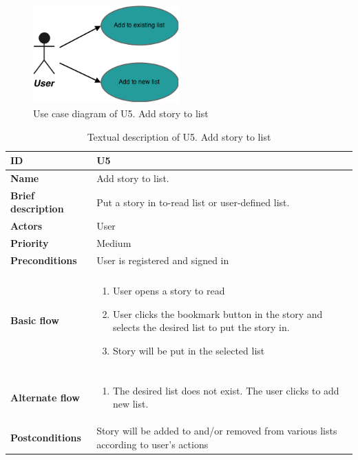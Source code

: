 \begin{figure}[hp]
	\includegraphics[width=0.5\textwidth]{fig/U5}
	\centering
	\caption{Use case diagram of U5. Add story to list}
	\label{Fig:U5}
\end{figure}

\begin{table}[hp]
	\renewcommand{\arraystretch}{1.5}
	\centering
	\caption{Textual description of U5. Add story to list}
	\begin{tabular}[b]{| p{3.5cm} | p{13cm}|}\hline
		\textbf{ID} 				& U5									\\\hline
		\textbf{Name} 				& Add story to list.					\\\hline
		\textbf{Brief description}	& Put a story in to-read list or user-defined  list. 		\\\hline
		\textbf{Actors} 			& User									\\\hline
		\textbf{Priority}			& Medium								\\\hline
		\textbf{Preconditions}		& User is registered and signed in		\\\hline&\\[-2ex]
		\textbf{Basic flow}			& \begin{minipage}{5in}
			\begin{enumerate}[noitemsep]
				\item User opens a story to read
				\item User clicks the bookmark button in the story and selects the desired list to put the story in.
				\item Story will be put in the selected list
			\end{enumerate}						
		\end{minipage}						\\\hline&\\[-2ex]
		\textbf{Alternate flow}		& \begin{minipage}{5in}
			\begin{enumerate}[noitemsep]
				\item The desired list does not exist. The user clicks to add new list.
			\end{enumerate}
		\end{minipage}							\\\hline
		\textbf{Postconditions}		& Story will be added to and/or removed from various lists according to user's actions\\\hline
	\end{tabular}
	\label{Tab:U5}
\end{table}

